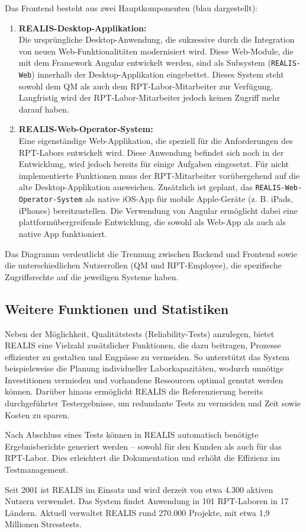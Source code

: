 Das Frontend besteht aus zwei Hauptkomponenten (blau dargestellt):
\begin{enumerate}
    \item \textbf{REALIS-Desktop-Applikation:} \\
Die ursprüngliche Desktop-Anwendung, die sukzessive durch die Integration von neuen Web-Funktionalitäten modernisiert wird. Diese Web-Module, die mit dem Framework Angular entwickelt werden, sind als Subsystem (\texttt{REALIS-Web}) innerhalb der Desktop-Applikation eingebettet. Dieses System steht sowohl dem \gls{QM} als auch dem \gls{RPT}-Labor-Mitarbeiter zur Verfügung. Langfristig wird der \gls{RPT}-Labor-Mitarbeiter jedoch keinen Zugriff mehr darauf haben.

\item \textbf{REALIS-Web-Operator-System:} \\
Eine eigenständige Web-Applikation, die speziell für die Anforderungen des \gls{RPT}-Labors entwickelt wird. Diese Anwendung befindet sich noch in der Entwicklung, wird jedoch bereits für einige Aufgaben eingesetzt. Für nicht implementierte Funktionen muss der \gls{RPT}-Mitarbeiter vorübergehend auf die alte Desktop-Applikation ausweichen. Zusätzlich ist geplant, das \texttt{REALIS-Web-Operator-System} als native iOS-App für mobile Apple-Geräte (z. B. iPads, iPhones) bereitzustellen. Die Verwendung von Angular ermöglicht dabei eine plattformübergreifende Entwicklung, die sowohl als Web-App als auch als native App funktioniert.
\end{enumerate}

Das Diagramm verdeutlicht die Trennung zwischen Backend und Frontend sowie die unterschiedlichen Nutzerrollen (\gls{QM} und \gls{RPT}-Employee), die spezifische Zugriffsrechte auf die jeweiligen Systeme haben.


\subsection{Weitere Funktionen und Statistiken}
Neben der Möglichkeit, Qualitätstests (Reliability-Tests) anzulegen, bietet \gls{REALIS} eine Vielzahl zusätzlicher Funktionen, die dazu beitragen, Prozesse effizienter zu gestalten und Engpässe zu vermeiden. So unterstützt das System beispielsweise die Planung individueller Laborkapazitäten, wodurch unnötige Investitionen vermieden und vorhandene Ressourcen optimal genutzt werden können. Darüber hinaus ermöglicht \gls{REALIS} die Referenzierung bereits durchgeführter Testergebnisse, um redundante Tests zu vermeiden und Zeit sowie Kosten zu sparen.

Nach Abschluss eines Tests können in \gls{REALIS} automatisch benötigte Ergebnisberichte generiert werden – sowohl für den Kunden als auch für das \gls{RPT}-Labor. Dies erleichtert die Dokumentation und erhöht die Effizienz im Testmanagement.

Seit 2001 ist \gls{REALIS} im Einsatz und wird derzeit von etwa 4.300 aktiven Nutzern verwendet. Das System findet Anwendung in 101 \gls{RPT}-Laboren in 17 Ländern. Aktuell verwaltet \gls{REALIS} rund 270.000 Projekte, mit etwa 1,9 Millionen Stresstests.